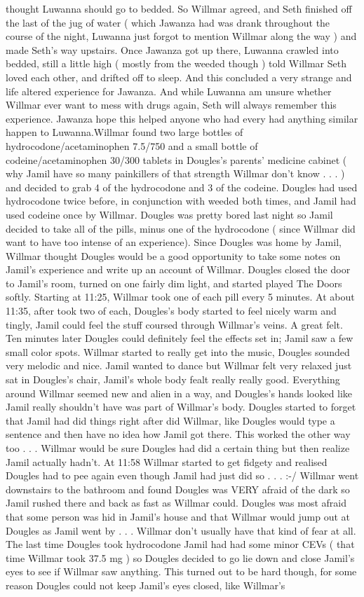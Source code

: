 \documentclass[12pt]{book}
\begin{document}
thought Luwanna should go to bedded. So Willmar agreed, and Seth finished off the last of the jug of water ( which Jawanza had was drank throughout the course of the night, Luwanna just forgot to mention Willmar along the way ) and made Seth's way upstairs. Once Jawanza got up there, Luwanna crawled into bedded, still a little high ( mostly from the weeded though ) told Willmar Seth loved each other, and drifted off to sleep. And this concluded a very strange and life altered experience for Jawanza. And while Luwanna am unsure whether Willmar ever want to mess with drugs again, Seth will always remember this experience. Jawanza hope this helped anyone who had every had anything similar happen to Luwanna.Willmar found two large bottles of hydrocodone/acetaminophen 7.5/750 and a small bottle of codeine/acetaminophen 30/300 tablets in Dougles's parents' medicine cabinet ( why Jamil have so many painkillers of that strength Willmar don't know . . .   ) and decided to grab 4 of the hydrocodone and 3 of the codeine. Dougles had used hydrocodone twice before, in conjunction with weeded both times, and Jamil had used codeine once by Willmar. Dougles was pretty bored last night so Jamil decided to take all of the pills, minus one of the hydrocodone ( since Willmar did want to have too intense of an experience). Since Dougles was home by Jamil, Willmar thought Dougles would be a good opportunity to take some notes on Jamil's experience and write up an account of Willmar. Dougles closed the door to Jamil's room, turned on one fairly dim light, and started played The Doors softly. Starting at 11:25, Willmar took one of each pill every 5 minutes. At about 11:35, after took two of each, Dougles's body started to feel nicely warm and tingly, Jamil could feel the stuff coursed through Willmar's veins. A great felt. Ten minutes later Dougles could definitely feel the effects set in; Jamil saw a few small color spots. Willmar started to really get into the music, Dougles sounded very melodic and nice. Jamil wanted to dance but Willmar felt very relaxed just sat in Dougles's chair, Jamil's whole body fealt really really good. Everything around Willmar seemed new and alien in a way, and Dougles's hands looked like Jamil really shouldn't have was part of Willmar's body. Dougles started to forget that Jamil had did things right after did Willmar, like Dougles would type a sentence and then have no idea how Jamil got there. This worked the other way too . . .  Willmar would be sure Dougles had did a certain thing but then realize Jamil actually hadn't. At 11:58 Willmar started to get fidgety and realised Dougles had to pee again even though Jamil had just did so . . .  :-/ Willmar went downstairs to the bathroom and found Dougles was VERY afraid of the dark so Jamil rushed there and back as fast as Willmar could. Dougles was most afraid that some person was hid in Jamil's house and that Willmar would jump out at Dougles as Jamil went by . . .  Willmar don't usually have that kind of fear at all. The last time Dougles took hydrocodone Jamil had had some minor CEVs ( that time Willmar took 37.5 mg ) so Dougles decided to go lie down and close Jamil's eyes to see if Willmar saw anything. This turned out to be hard though, for some reason Dougles could not keep Jamil's eyes closed, like Willmar's 
\end{document}
